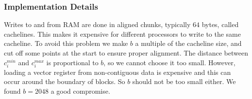 \subsubsection{Implementation Details}

Writes to and from RAM are done in aligned chunks, typically $64$ bytes, called
cachelines. This makes it expensive for different processors to write to the 
same cacheline. To avoid this problem we make $b$ a multiple of
the cacheline size, and cut off some points at the start to ensure proper
alignment. The distance between $c_i^{min}$ and $c_i^{max}$ is proportional
to $b$, so we cannot choose it too small. However, loading a vector register 
from non-contiguous data is expensive and this can occur around the boundary
of blocks. So $b$ should not be too small either. We found $b = 2048$ a good
compromise.
